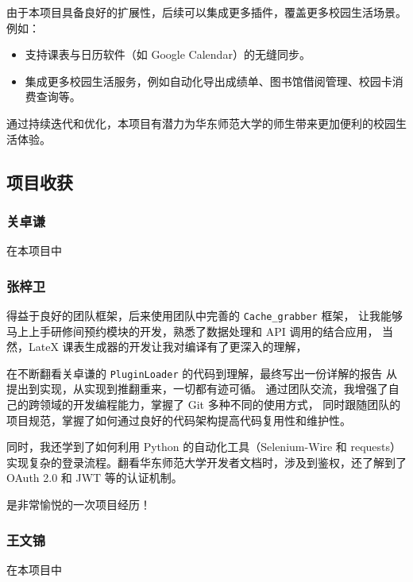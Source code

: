 \documentclass[14pt,a4paper,UTF8,twoside]{article}
\begin{document}
由于本项目具备良好的扩展性，后续可以集成更多插件，覆盖更多校园生活场景。例如：

\begin{itemize}
    \item 支持课表与日历软件（如 Google Calendar）的无缝同步。
    \item 集成更多校园生活服务，例如自动化导出成绩单、图书馆借阅管理、校园卡消费查询等。
\end{itemize}

通过持续迭代和优化，本项目有潜力为华东师范大学的师生带来更加便利的校园生活体验。

\subsection{项目收获}

\subsubsection*{关卓谦}

\begin{Thought}
在本项目中
\end{Thought}

\subsubsection*{张梓卫}

\begin{Thought}
得益于良好的团队框架，后来使用团队中完善的 \texttt{Cache\_grabber} 框架，
让我能够马上上手研修间预约模块的开发，熟悉了数据处理和 API 调用的结合应用，
当然，LateX 课表生成器的开发让我对编译有了更深入的理解，

\vspace{0.3cm}

在不断翻看关卓谦的 \texttt{PluginLoader} 的代码到理解，最终写出一份详解的报告
从提出到实现，从实现到推翻重来，一切都有迹可循。
通过团队交流，我增强了自己的跨领域的开发编程能力，掌握了 Git 多种不同的使用方式，
同时跟随团队的项目规范，掌握了如何通过良好的代码架构提高代码复用性和维护性。

\vspace{0.3cm}

同时，我还学到了如何利用 Python 的自动化工具（Selenium-Wire 和 requests）
实现复杂的登录流程。翻看华东师范大学开发者文档时，涉及到鉴权，还了解到了 OAuth 2.0 和 JWT 等的认证机制。

\vspace{0.3cm}

是非常愉悦的一次项目经历！
\end{Thought}

\subsubsection*{王文锦}

\begin{Thought}
在本项目中
\end{Thought}
\end{document}
